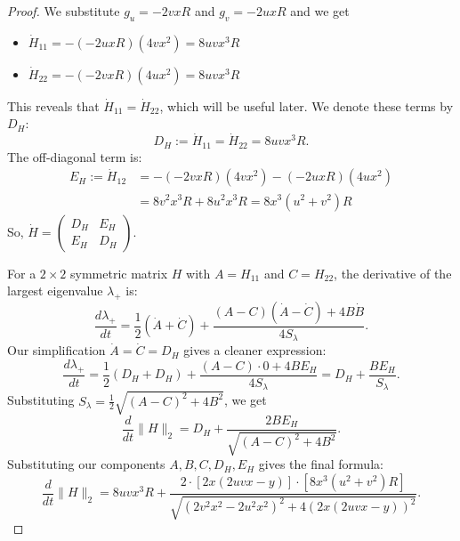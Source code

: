 \documentclass[a4paper,11pt]{article}
\newcommand{\1}{\mathbbm{1}}
\theoremstyle{plain}
\begin{document}
\begin{proof}
We substitute $g_u = -2vxR$ and $g_v = -2uxR$ and we get
\begin{itemize}
    \item $\dot{H}_{11} = -(-2uxR)(4vx^2) = 8uvx^3 R$
    \item $\dot{H}_{22} = -(-2vxR)(4ux^2) = 8uvx^3 R$
\end{itemize}
This reveals that $\dot{H}_{11} = \dot{H}_{22}$, which will be useful later. We denote these terms by $D_H$:
\begin{equation*}
    D_H := \dot{H}_{11} = \dot{H}_{22} = 8uvx^3 R.
\end{equation*}
The off-diagonal term is:
\begin{align*}
    E_H := \dot{H}_{12} &= -(-2vxR)(4vx^2) - (-2uxR)(4ux^2) \nonumber \\
    &= 8v^2x^3 R + 8u^2x^3 R = 8x^3(u^2+v^2)R
\end{align*}
So, $\dot{H} = \begin{pmatrix} D_H & E_H \\ E_H & D_H \end{pmatrix}$.



For a $2 \times 2$ symmetric matrix $H$ with $A=H_{11}$ and $C=H_{22}$, the derivative of the largest eigenvalue $\lambda_+$ is:
$$
\frac{d\lambda_+}{dt} = \frac{1}{2}(\dot{A} + \dot{C}) + \frac{(A-C)(\dot{A}-\dot{C}) + 4B\dot{B}}{4 S_{\lambda}}.
$$
Our simplification $\dot{A} = \dot{C} = D_H$ gives a cleaner expression:
$$
\frac{d\lambda_+}{dt} = \frac{1}{2}(D_H + D_H) + \frac{(A-C) \cdot 0 + 4B E_H}{4 S_{\lambda}} = D_H + \frac{B E_H}{S_{\lambda}}.
$$
Substituting $S_{\lambda} = \frac{1}{2} \sqrt{(A-C)^2 + 4B^2}$, we get
\begin{equation*}
    \frac{d}{dt} \|H\|_2 = D_H + \frac{2 B E_H}{\sqrt{(A-C)^2 + 4B^2}}.
\end{equation*}
Substituting our components $A, B, C, D_H, E_H$ gives the final formula:
\begin{equation*}
    \frac{d}{dt} \|H\|_2 = 8uvx^3 R + \frac{2 \cdot [2x(2uvx - y)] \cdot [8x^3(u^2+v^2)R]}{\sqrt{(2v^2x^2 - 2u^2x^2)^2 + 4(2x(2uvx - y))^2}}.
\end{equation*}



\end{proof}
\end{document}
